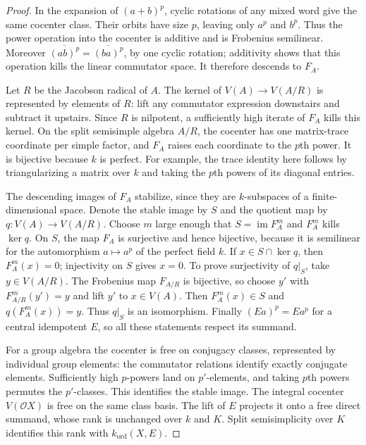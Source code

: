\begin{proof}
In the expansion of $(a+b)^p$, cyclic rotations of any mixed word
give the same cocenter class. Their orbits have size $p$, leaving
only $a^p$ and $b^p$. Thus the power operation into the cocenter
is additive and is Frobenius semilinear. Moreover
$\overline{(ab)^p}=\overline{(ba)^p}$, by one cyclic rotation;
additivity shows that this operation kills the linear commutator
space. It therefore descends to $F_A$.

Let $R$ be the Jacobson radical of $A$. The kernel of
$V(A)\longrightarrow V(A/R)$ is represented by elements of $R$:
lift any commutator expression downstairs and subtract it upstairs.
Since $R$ is nilpotent, a sufficiently high iterate of $F_A$ kills
this kernel. On the split semisimple algebra $A/R$, the cocenter
has one matrix-trace coordinate per simple factor, and $F_A$
raises each coordinate to the $p$th power. It is bijective because
$k$ is perfect. For example, the trace identity here follows by
triangularizing a matrix over $k$ and taking the $p$th powers of
its diagonal entries.

The descending images of $F_A$ stabilize, since they are
$k$-subspaces of a finite-dimensional space. Denote the stable image
by $S$ and the quotient map by $q:V(A)\to V(A/R)$.
Choose $m$ large enough that $S=\operatorname{im}F_A^m$ and
$F_A^m$ kills $\ker q$. On $S$, the map $F_A$ is surjective
and hence bijective, because it is semilinear for the automorphism
$a\mapsto a^p$ of the perfect field $k$. If $x\in S\cap\ker q$,
then $F_A^m(x)=0$; injectivity on $S$ gives $x=0$.
To prove surjectivity of $q|_S$, take $y\in V(A/R)$. The
Frobenius map $F_{A/R}$ is bijective, so choose $y'$ with
$F_{A/R}^m(y')=y$ and lift $y'$ to $x\in V(A)$. Then
$F_A^m(x)\in S$ and $q(F_A^m(x))=y$. Thus $q|_S$ is an
isomorphism. Finally
$(Ea)^p=Ea^p$ for a central idempotent $E$, so all these statements
respect its summand.

For a group algebra the cocenter is free on conjugacy classes,
represented by individual group elements: the commutator
relations identify exactly conjugate elements. Sufficiently high
$p$-powers land on $p'$-elements, and taking $p$th powers permutes
the $p'$-classes. This identifies the stable image. The integral
cocenter $V(\mathcal O X)$ is free on the same class basis. The
lift of $E$ projects it onto a free direct summand, whose rank is
unchanged over $k$ and $K$. Split semisimplicity over $K$ identifies
this rank with $k_{\mathrm{ord}}(X,E)$.
\end{proof}

